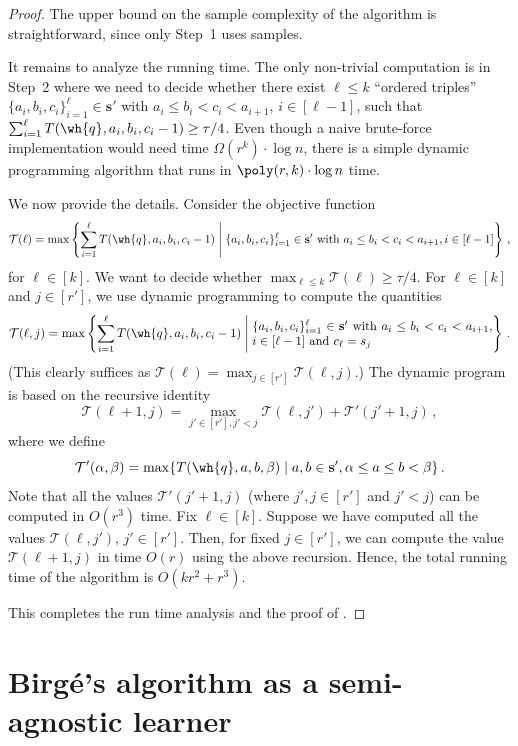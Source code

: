 \begin{proof}
The upper bound on the sample complexity of the algorithm is straightforward, since
only Step~1 uses samples. 

 {It remains to analyze the running time. The only non-trivial computation is in Step~2 where we need to decide whether 
there exist $\ell \le k$ ``ordered triples'' $\{a_i, b_i, c_i\}_{i=1}^{\ell} \in  \mathbf{s}'$ with $a_i \le b_i < c_i < a_{i+1}$, $i \in [\ell-1]$,
such that $\sum_{i=1}^{\ell} T(\wh{q}, a_i, b_i, c_i-1) \ge \tau/4$.
Even though a naive brute-force implementation would need time $\Omega(r^k) \cdot \log n$, 
there is a simple dynamic programming algorithm that runs in $\poly(r, k) \cdot \log n$
time.

We now provide the details. Consider the objective function
$$\mathcal{T}(\ell) = \max \left\{ \sum_{i=1}^{\ell} T(\wh{q}, a_i, b_i, c_i-1) \;\middle|\; 
\{a_i, b_i, c_i\}_{i=1}^{\ell} \in \mathbf{s}'  \textrm{ with } a_i \le b_i < c_i < a_{i+1}, i \in [\ell-1] \right\}\,,$$
for $\ell \in [k]$. We want to decide whether $\max_{\ell \le k}\mathcal{T}(\ell) \ge \tau/4$. 
%
For $\ell \in [k]$ and $j \in [r']$, we use dynamic programming to compute the quantities 
$$\mathcal{T}(\ell, j) = \max \left\{ \sum_{i=1}^{\ell} T(\wh{q}, a_i,
  b_i, c_i-1) \;\middle|\; \parbox{68mm}{$\{a_i, b_i,
      c_i\}_{i=1}^{\ell} \in \mathbf{s}'$ with $a_i \le b_i < c_i < a_{i+1}$, $i \in [\ell-1]$ and $c_{\ell} = s_j$} \right\}\,.$$
(This clearly suffices as $\mathcal{T}(\ell) = \max_{j \in [r']} \mathcal{T}(\ell, j)$.)
The dynamic program is based on the recursive identity 
$$\mathcal{T}(\ell+1, j) = \max_{j' \in [r'],  j'<j}\mathcal{T}(\ell, j') +  \mathcal{T}'(j'+1, j)\,,$$
where we define 
\[
\mathcal{T}'(\alpha,\beta)  =  \max \{ T(\wh{q}, a, b, \beta) \mid  a,b \in \mathbf{s}', 
\alpha \leq a \leq b < \beta \}\,.
\]
Note that all the values $\mathcal{T}'(j'+1,j)$ (where $j',j \in [r']$ and $j'<j$) can be computed in $O(r^3)$ time. Fix $\ell \in [k]$. Suppose we have computed all
the values $\mathcal{T}(\ell, j')$, $j' \in [r']$. Then, for fixed $j \in [r']$, we can compute the value $\mathcal{T}(\ell+1, j)$ in time $O(r)$ 
using the above recursion. Hence, the total running time of the algorithm is $O(kr^2+r^3)$.
}
\noindent This completes the run time analysis and the proof of .
\end{proof}

\appendix

%

\section{Birg{\'e}'s algorithm as a semi-agnostic learner}
\label{sec:birge-agnostic}

